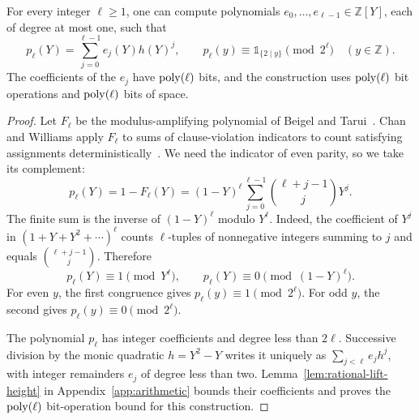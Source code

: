\begin{lemma}\label{lem:rational-idempotent}
For every integer $\ell\ge1$, one can compute polynomials
$e_0,\ldots,e_{\ell-1}\in\mathbb Z[Y]$, each of degree at most one,
such that
\begin{equation}\label{eq:idempotent-expansion}
 p_\ell(Y)=\sum_{j=0}^{\ell-1}e_j(Y)h(Y)^j,
 \qquad
 p_\ell(y)\equiv\mathds{1}_{\{2\mid y\}}\pmod{2^\ell}
 \quad(y\in\mathbb Z).
\end{equation}
The coefficients of the $e_j$ have $\operatorname{poly}(\ell)$ bits, and the
construction uses $\operatorname{poly}(\ell)$ bit operations and $\operatorname{poly}(\ell)$
bits of space.
\end{lemma}
\begin{proof}
Let $F_\ell$ be the modulus-amplifying polynomial of Beigel and
Tarui~\cite[Section~2.3]{BT94}. Chan and Williams apply $F_\ell$ to
sums of clause-violation indicators to count satisfying assignments
deterministically~\cite[Theorem~2.5 and proof of Theorem~1.6]{CW21}.
We need the indicator of even parity, so we take its complement:
\begin{equation}\label{eq:binary-indicator}
 p_\ell(Y)=1-F_\ell(Y)=(1-Y)^\ell
       \sum_{j=0}^{\ell-1}\binom{\ell+j-1}{j}Y^j.
\end{equation}
The finite sum is the inverse of $(1-Y)^\ell$ modulo $Y^\ell$.
Indeed, the coefficient of $Y^j$ in $(1+Y+Y^2+\cdots)^\ell$
counts $\ell$-tuples of nonnegative integers summing to $j$ and equals
$\binom{\ell+j-1}{j}$. Therefore
\[
 p_\ell(Y)\equiv1\pmod{Y^\ell},
 \qquad
 p_\ell(Y)\equiv0\pmod{(1-Y)^\ell}.
\]
For even $y$, the first congruence gives $p_\ell(y)\equiv1\pmod{2^\ell}$.
For odd $y$, the second gives $p_\ell(y)\equiv0\pmod{2^\ell}$.

The polynomial $p_\ell$ has integer coefficients and degree less
than $2\ell$. Successive division by the monic quadratic
$h=Y^2-Y$ writes it uniquely as
$\sum_{j<\ell}e_jh^j$, with integer remainders $e_j$ of degree
less than two. Lemma~\ref{lem:rational-lift-height} in
Appendix~\ref{app:arithmetic} bounds their coefficients and proves
the $\operatorname{poly}(\ell)$ bit-operation bound for this construction.
\end{proof}


